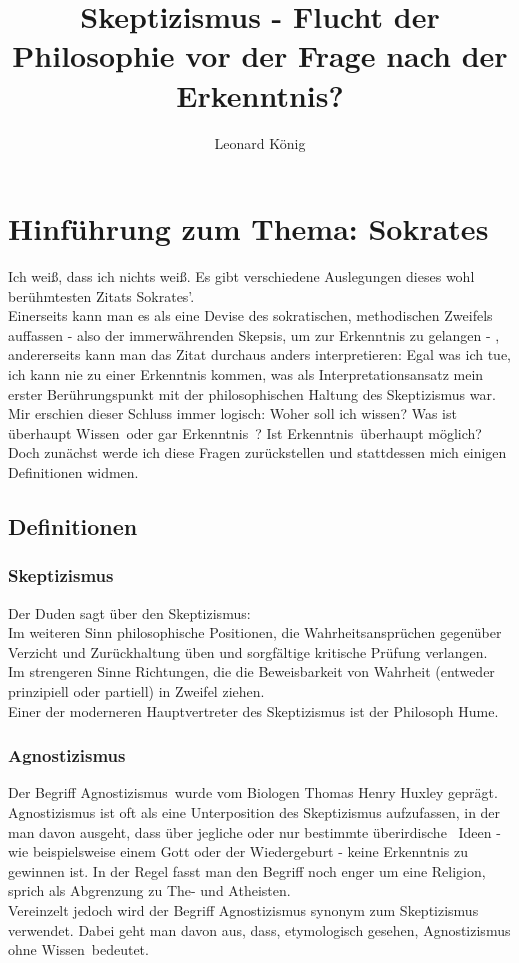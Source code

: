\documentclass[12pt,a4paper]{article}
\author{Leonard König}
\title{Skeptizismus - Flucht der Philosophie vor der Frage nach der Erkenntnis?}
\begin{document}
\maketitle
\tableofcontents
\newpage
%
\section{Hinführung zum Thema: Sokrates}
\linenumbers
\glqq Ich weiß, dass ich nichts weiß\grqq. Es gibt verschiedene Auslegungen dieses wohl berühmtesten Zitats Sokrates'.%
\\Einerseits kann man es als eine Devise des sokratischen, methodischen Zweifels auffassen - also der immerwährenden Skepsis, um zur Erkenntnis zu gelangen - , andererseits kann man das Zitat durchaus anders interpretieren: Egal was ich tue, ich kann nie zu einer Erkenntnis kommen, was als Interpretationsansatz mein erster Berührungspunkt mit der philosophischen Haltung des Skeptizismus war.\\
Mir erschien dieser Schluss immer logisch: Woher soll ich \glqq wissen\grqq? Was ist überhaupt \glqq Wissen\grqq\ oder gar \glqq Erkenntnis\grqq\ ? Ist \glqq Erkenntnis\grqq\ überhaupt möglich?\\
Doch zunächst werde ich diese Fragen zurückstellen und stattdessen mich einigen Definitionen widmen.
	\subsection{Definitionen}
		\subsubsection{Skeptizismus}
Der Duden sagt über den Skeptizismus:\\
\glqq Im weiteren Sinn philosophische Positionen, die Wahrheitsansprüchen gegenüber Verzicht und Zurückhaltung üben und sorgfältige kritische Prüfung verlangen.\\
Im strengeren Sinne Richtungen, die die Beweisbarkeit von Wahrheit (entweder prinzipiell oder partiell) in Zweifel ziehen.\grqq \\
Einer der moderneren Hauptvertreter des Skeptizismus ist der Philosoph Hume.%
		\subsubsection{Agnostizismus}
Der Begriff \glqq Agnostizismus\grqq\ wurde vom Biologen Thomas Henry Huxley geprägt. Agnostizismus ist oft als eine Unterposition des Skeptizismus aufzufassen, in der man davon ausgeht, dass über jegliche oder nur bestimmte überirdische%
\ Ideen - wie beispielsweise einem Gott oder der Wiedergeburt - keine Erkenntnis zu gewinnen ist. In der Regel fasst man den Begriff noch enger um eine Religion, sprich als Abgrenzung zu The- und Atheisten.\\ 
Vereinzelt jedoch wird der Begriff Agnostizismus synonym zum Skeptizismus verwendet. Dabei geht man davon aus, dass, etymologisch gesehen, Agnostizismus \glqq ohne Wissen\grqq\ bedeutet.
\end{document}
